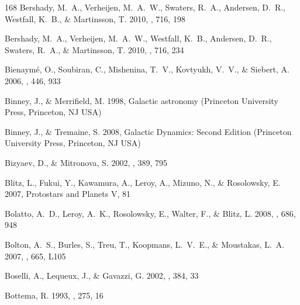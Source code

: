 \documentclass[apj,iop,numberedappendix]{emulateapj}
\begin{document}
\begin{thebibliography}{168}
{Bershady}, M.~A., {Verheijen}, M.~A.~W., {Swaters}, R.~A., {Andersen}, D.~R.,
  {Westfall}, K.~B., \& {Martinsson}, T. 2010{}, \apj, 716, 198

{Bershady}, M.~A., {Verheijen}, M.~A.~W., {Westfall}, K.~B., {Andersen}, D.~R.,
  {Swaters}, R.~A., \& {Martinsson}, T. 2010{}, \apj, 716, 234

{Bienaym{\'e}}, O., {Soubiran}, C., {Mishenina}, T.~V., {Kovtyukh}, V.~V., \&
  {Siebert}, A. 2006, \aap, 446, 933

{Binney}, J., \& {Merrifield}, M. 1998, {Galactic astronomy} (Princeton
  University Press, Princeton, NJ USA)

{Binney}, J., \& {Tremaine}, S. 2008, {Galactic Dynamics: Second Edition}
  (Princeton University Press, Princeton, NJ USA)

{Bizyaev}, D., \& {Mitronova}, S. 2002, \aap, 389, 795

{Blitz}, L., {Fukui}, Y., {Kawamura}, A., {Leroy}, A., {Mizuno}, N., \&
  {Rosolowsky}, E. 2007, Protostars and Planets V, 81

{Bolatto}, A.~D., {Leroy}, A.~K., {Rosolowsky}, E., {Walter}, F., \& {Blitz},
  L. 2008, \apj, 686, 948

{Bolton}, A.~S., {Burles}, S., {Treu}, T., {Koopmans}, L.~V.~E., \&
  {Moustakas}, L.~A. 2007, \apjl, 665, L105

{Boselli}, A., {Lequeux}, J., \& {Gavazzi}, G. 2002, \aap, 384, 33

{Bottema}, R. 1993, \aap, 275, 16


\end{thebibliography}
\end{document}
